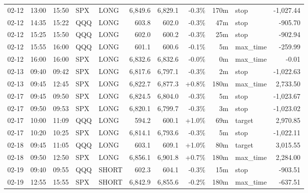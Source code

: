 \documentclass[11pt,a4paper,twoside]{article}
\begin{document}
\begin{center}
\begin{longtable}{>{\color{txtmain}}l l l l l r r r r >{\color{txtmain}}l r}
02-12 & 13:00 & 15:50 & SPX & LONG & 6,849.6 & 6,829.1 & \textcolor{lossred}{-0.3\%} & 170m & stop & \textcolor{lossred}{-1,027.44} \\
02-12 & 14:35 & 15:22 & QQQ & LONG & 603.8 & 602.0 & \textcolor{lossred}{-0.3\%} & 47m & stop & \textcolor{lossred}{-905.70} \\
02-12 & 15:25 & 15:50 & QQQ & LONG & 602.0 & 600.2 & \textcolor{lossred}{-0.3\%} & 25m & stop & \textcolor{lossred}{-902.94} \\
02-12 & 15:55 & 16:00 & QQQ & LONG & 601.1 & 600.6 & \textcolor{lossred}{-0.1\%} & 5m & max\_time & \textcolor{lossred}{-259.99} \\
02-12 & 16:00 & 16:00 & SPX & LONG & 6,832.6 & 6,832.6 & \textcolor{lossred}{-0.0\%} & 0m & max\_time & \textcolor{lossred}{-0.01} \\
02-13 & 09:40 & 09:42 & SPX & LONG & 6,817.6 & 6,797.1 & \textcolor{lossred}{-0.3\%} & 2m & stop & \textcolor{lossred}{-1,022.63} \\
02-13 & 09:45 & 12:45 & SPX & LONG & 6,822.7 & 6,877.3 & \textcolor{wingreen}{+0.8\%} & 180m & max\_time & \textcolor{wingreen}{2,733.50} \\
02-17 & 09:45 & 09:50 & SPX & LONG & 6,824.5 & 6,804.0 & \textcolor{lossred}{-0.3\%} & 5m & stop & \textcolor{lossred}{-1,023.67} \\
02-17 & 09:50 & 09:53 & SPX & LONG & 6,820.1 & 6,799.7 & \textcolor{lossred}{-0.3\%} & 3m & stop & \textcolor{lossred}{-1,023.02} \\
02-17 & 10:00 & 11:09 & QQQ & LONG & 594.2 & 600.1 & \textcolor{wingreen}{+1.0\%} & 69m & target & \textcolor{wingreen}{2,970.85} \\
02-17 & 10:20 & 10:25 & SPX & LONG & 6,814.1 & 6,793.6 & \textcolor{lossred}{-0.3\%} & 5m & stop & \textcolor{lossred}{-1,022.11} \\
02-18 & 09:45 & 11:05 & QQQ & LONG & 603.1 & 609.1 & \textcolor{wingreen}{+1.0\%} & 80m & target & \textcolor{wingreen}{3,015.55} \\
02-18 & 09:50 & 12:50 & SPX & LONG & 6,856.1 & 6,901.8 & \textcolor{wingreen}{+0.7\%} & 180m & max\_time & \textcolor{wingreen}{2,284.00} \\
02-19 & 09:40 & 09:55 & QQQ & SHORT & 602.3 & 604.1 & \textcolor{lossred}{-0.3\%} & 15m & stop & \textcolor{lossred}{-903.51} \\
02-19 & 12:55 & 15:55 & SPX & SHORT & 6,842.9 & 6,855.6 & \textcolor{lossred}{-0.2\%} & 180m & max\_time & \textcolor{lossred}{-637.51} \\

\end{longtable}
\end{center}
\end{document}
